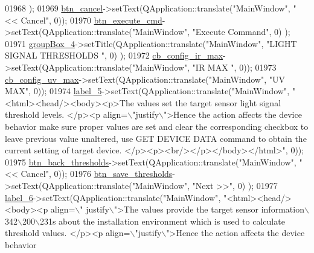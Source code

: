 \begin{DoxyCode}
01968         );
01969         \hyperlink{a00027_a26ea4040157d183322b8c1e5d7a55c9f}{btn\_cancel}->setText(QApplication::translate(\textcolor{stringliteral}{"MainWindow"}, \textcolor{stringliteral}{"<< Cancel"}, 0));
01970         \hyperlink{a00027_a9ea50d44e38316e4203933698cbc14a6}{btn\_execute\_cmd}->setText(QApplication::translate(\textcolor{stringliteral}{"MainWindow"}, \textcolor{stringliteral}{"Execute Command"}, 0)
      );
01971         \hyperlink{a00027_ad8a919e5634add9c41bfc319cb9fd338}{groupBox\_4}->setTitle(QApplication::translate(\textcolor{stringliteral}{"MainWindow"}, \textcolor{stringliteral}{"LIGHT SIGNAL THRESHOLDS "}, 0)
      );
01972         \hyperlink{a00027_ae78fd3c777d081ab1ec1d0142bec3320}{cb\_config\_ir\_max}->setText(QApplication::translate(\textcolor{stringliteral}{"MainWindow"}, \textcolor{stringliteral}{"IR MAX "}, 0));
01973         \hyperlink{a00027_a13ce5fddc83683d7b8b717f0b9a4e2cf}{cb\_config\_uv\_max}->setText(QApplication::translate(\textcolor{stringliteral}{"MainWindow"}, \textcolor{stringliteral}{"UV MAX"}, 0));
01974         \hyperlink{a00027_ad6bab8fb8903b8f41afea1218ee52695}{label\_5}->setText(QApplication::translate(\textcolor{stringliteral}{"MainWindow"}, \textcolor{stringliteral}{"<html><head/><body><p>The values set
       the target sensor light signal threshold levels.  </p><p align=\(\backslash\)"justify\(\backslash\)">Hence the action affects the
       device behavior make sure proper values are set and clear the corresponding checkbox to leave previous value
       unaltered, use GET DEVICE DATA command to obtain the current setting of target device.
       </p><p><br/></p></body></html>"}, 0));
01975         \hyperlink{a00027_a5a4e0ac94bd22955cc41bcc276a04278}{btn\_back\_thresholds}->setText(QApplication::translate(\textcolor{stringliteral}{"MainWindow"}, \textcolor{stringliteral}{"<< Cancel"}, 
      0));
01976         \hyperlink{a00027_ac265ae0ccaa1154deaa634d19415f775}{btn\_save\_thresholds}->setText(QApplication::translate(\textcolor{stringliteral}{"MainWindow"}, \textcolor{stringliteral}{"Next >>"}, 0)
      );
01977         \hyperlink{a00027_a663f728e6244926a795c6e6892673b1d}{label\_6}->setText(QApplication::translate(\textcolor{stringliteral}{"MainWindow"}, \textcolor{stringliteral}{"<html><head/><body><p align=\(\backslash\)"
      justify\(\backslash\)">The values provide the target sensor information\(\backslash\)342\(\backslash\)200\(\backslash\)231s about the installation environment which
       is used to calculate threshold values. </p><p align=\(\backslash\)"justify\(\backslash\)">Hence the action affects the device behavior
}
\end{DoxyCode}
